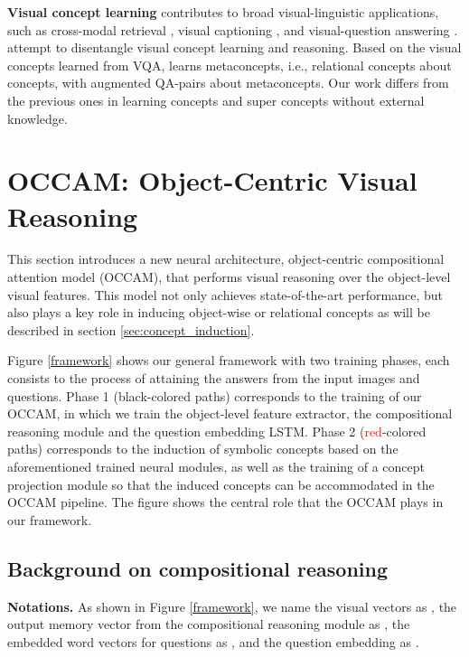 \documentclass[10pt,twocolumn,letterpaper]{article}
\begin{document}
\textbf{Visual concept learning} contributes to broad visual-linguistic applications, such as cross-modal retrieval \cite{kiros2014unifying}, visual captioning \cite{karpathy2015deep}, and visual-question answering \cite{malinowski2015ask, antol2015vqa}. \cite{yi2018neural, mao2018neuro} attempt to disentangle visual concept learning and reasoning. Based on the visual concepts learned from VQA, \cite{han2019visual} learns metaconcepts, i.e., relational concepts about concepts, with augmented QA-pairs about metaconcepts. Our work differs from the previous ones in learning concepts and super concepts without external knowledge.
\vspace{-3mm}




\section{OCCAM: Object-Centric Visual Reasoning}
\vspace{-2mm}
This section introduces a new neural architecture, object-centric compositional attention model (OCCAM), that performs visual reasoning over the object-level visual features.
This model not only achieves state-of-the-art performance, but also plays a key role in inducing object-wise or relational concepts as will be described in section \ref{sec:concept_induction}.

Figure \ref{framework} shows our general framework with two training phases, each consists to the process of attaining the answers from the input images and questions.
Phase 1 (black-colored paths) corresponds to the training of our OCCAM, in which we train the object-level feature extractor, the compositional reasoning module and the question embedding LSTM. 
Phase 2 (\textcolor{red}{red}-colored paths) corresponds to the induction of symbolic concepts based on the aforementioned trained neural modules, as well as the training of a concept projection module so that the induced concepts can be accommodated in the OCCAM pipeline. 
The figure shows the central role that the OCCAM plays in our framework.







\vspace{-2mm}
\subsection{Background on compositional reasoning}
\vspace{-2mm}
\label{ssec:mac}
\textbf{Notations.} As shown in Figure \ref{framework}, we name the visual vectors as , the output memory vector from the compositional reasoning module as , the embedded word vectors for questions as , and the question embedding as . 
\end{document}
